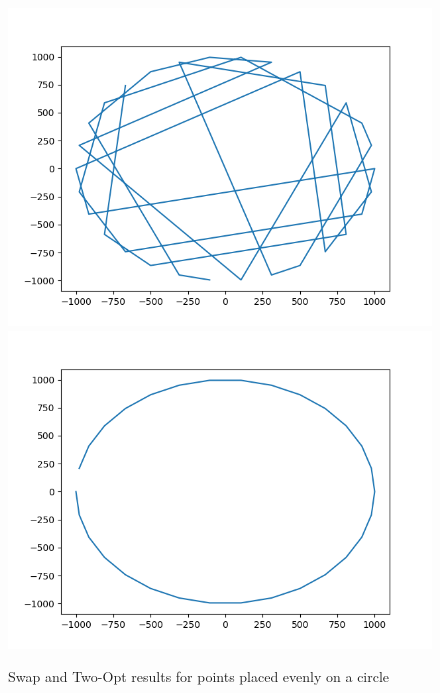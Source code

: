 \documentclass[12pt]{article}
\begin{document}
\begin{figure}
\includegraphics[scale=0.5]{CircleSwap.png}
\includegraphics[scale=0.5]{CircleTwoOpt.png}
\caption{Swap and Two-Opt results for points placed evenly on a circle}
\end{figure}
\end{document}
